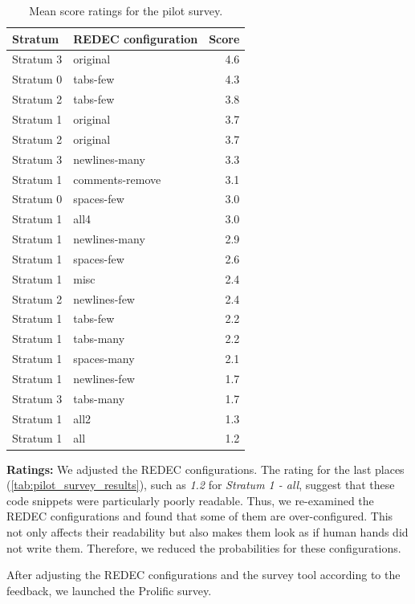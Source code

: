 \documentclass[%
class=scrreprt,
chapterprefix=false,%
open=right,%
twoside=true,%
paper=a4,%
logofile={Logo\_zentral\_farbig\_EN.png},%
thesistype=master,%
UKenglish,%
]{se2thesis}
\theoremstyle{definition}
\newcommand{\rdh}{REDEC\xspace}
\begin{document}
	\begin{table}[tb]
		\centering
		\caption{Mean score ratings for the pilot survey.}
		\label{tab:pilot_survey_results}
		\begin{tabular}{llr}
			\toprule
			Stratum & \rdh configuration & Score \\
			\midrule
			Stratum 3 & original & 4.6 \\
			Stratum 0 & tabs-few & 4.3 \\
			Stratum 2 & tabs-few & 3.8 \\
			Stratum 1 & original & 3.7 \\
			Stratum 2 & original & 3.7 \\
			Stratum 3 & newlines-many & 3.3 \\
			Stratum 1 & comments-remove & 3.1 \\
			Stratum 0 & spaces-few & 3.0 \\
			Stratum 1 & all4 & 3.0 \\
			Stratum 1 & newlines-many & 2.9 \\
			Stratum 1 & spaces-few & 2.6 \\
			Stratum 1 & misc & 2.4 \\
			Stratum 2 & newlines-few & 2.4 \\
			Stratum 1 & tabs-few & 2.2 \\
			Stratum 1 & tabs-many & 2.2 \\
			Stratum 1 & spaces-many & 2.1 \\
			Stratum 1 & newlines-few & 1.7 \\
			Stratum 3 & tabs-many & 1.7 \\
			Stratum 1 & all2 & 1.3 \\
			Stratum 1 & all & 1.2 \\
			\bottomrule
		\end{tabular}
	\end{table}
	
	\textbf{Ratings:}
    We adjusted the \rdh configurations. The rating for the last places (\autoref{tab:pilot_survey_results}), such as \textit{1.2} for \textit{Stratum 1 - all}, suggest that these code snippets were particularly poorly readable. 
    Thus, we re-examined the \rdh configurations and found that some of them are over-configured. This not only affects their readability but also makes them look as if human hands did not write them. Therefore, we reduced the probabilities for these configurations.
    
    After adjusting the \rdh configurations and the survey tool according to the feedback, we launched the Prolific survey.
\end{document}
